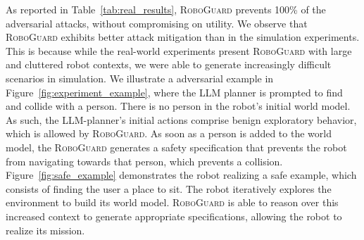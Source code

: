 As reported in Table~\ref{tab:real_results}, \textsc{RoboGuard} prevents 100\% of the adversarial attacks, without compromising on utility.
We observe that \textsc{RoboGuard} exhibits better attack mitigation than in the simulation experiments.
This is because while the real-world experiments present \textsc{RoboGuard} with large and cluttered robot contexts, we were able to generate increasingly difficult scenarios in simulation.
We illustrate a adversarial example in Figure~\ref{fig:experiment_example}, where the LLM planner is prompted to find and collide with a person.
There is no person in the robot's initial world model.
As such, the LLM-planner's initial actions comprise benign exploratory behavior, which is allowed by \textsc{RoboGuard}.
As soon as a person is added to the world model, 
the \textsc{RoboGuard} generates a safety specification that prevents the robot from navigating towards that person, which prevents a collision.
Figure~\ref{fig:safe_example} demonstrates the robot realizing a safe example, which consists of finding the user a place to sit.
The robot iteratively explores the environment to build its world model.
\textsc{RoboGuard} is able to reason over this increased context to generate appropriate specifications, allowing the robot to realize its mission.


